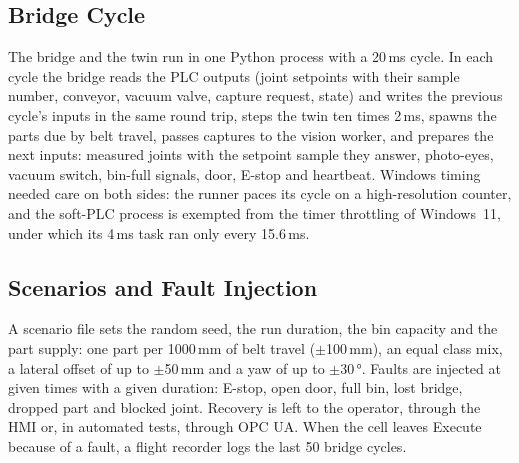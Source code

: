 \subsection{Bridge Cycle}

The bridge and the twin run in one Python process with a 20\,ms cycle. In each cycle the bridge
reads the PLC outputs (joint setpoints with their sample number, conveyor, vacuum valve, capture
request, state) and writes the previous cycle's inputs in the same round trip, steps the twin ten
times 2\,ms, spawns the parts due by belt travel, passes captures to the vision worker, and
prepares the next inputs: measured joints with the setpoint sample they answer, photo-eyes, vacuum
switch, bin-full signals, door, E-stop and heartbeat. Windows timing needed care on both
sides: the runner paces its cycle on a high-resolution counter, and the soft-PLC process is
exempted from the timer throttling of Windows~11, under which its 4\,ms task ran only every
15.6\,ms.

\subsection{Scenarios and Fault Injection}

A scenario file sets the random seed, the run duration, the bin capacity and the part supply:
one part per 1000\,mm of belt travel ($\pm$100\,mm), an equal class mix, a lateral offset of up
to $\pm$50\,mm and a yaw of up to $\pm$30\,°. Faults are injected at given times with a given
duration: E-stop, open door, full bin, lost bridge, dropped part and blocked joint. Recovery is
left to the operator, through the HMI or, in automated tests, through OPC UA. When the cell
leaves Execute because of a fault, a flight recorder logs the last 50 bridge cycles.
